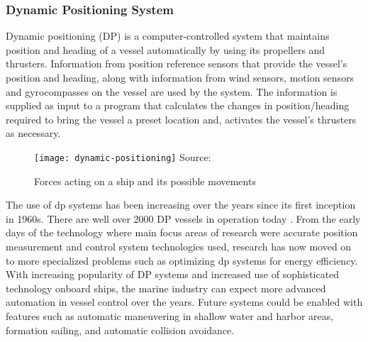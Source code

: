 \subsubsection{Dynamic Positioning System}

 Dynamic positioning (DP) is a computer-controlled system that maintains position and heading of a vessel automatically by using its propellers and thrusters. Information from position reference sensors that provide the vessel’s position and heading, along with information from wind sensors, motion sensors and gyrocompasses on the vessel are used by the system. The information is supplied as input to a program that calculates the changes in position/heading required to bring the vessel a preset location and, activates the vessel’s thrusters as necessary.

\begin{figure}
	\centering
	\caption{Forces acting on a ship and its possible movements}
	\texttt{[image: dynamic-positioning]}
	\hbox{\small Source: }
	\label{fig:shipforces}
\end{figure}


The use of dp systems has been increasing over the years since its first inception in 1960s. There are well over 2000 DP vessels in operation today \cite{sorensen2011survey}. From the early days of the technology where main focus areas of research were accurate position measurement and control system technologies used, research has now moved on to more specialized problems such as optimizing dp systems for energy efficiency. With increasing popularity of DP systems and increased use of sophisticated technology onboard ships, the marine industry can expect more advanced automation in vessel control over the years. Future systems could be enabled with features such as automatic maneuvering in shallow water and harbor areas, formation sailing, and automatic collision avoidance.



